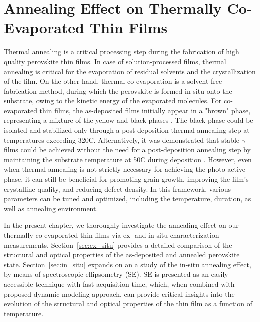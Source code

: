 \chapter{Annealing Effect on Thermally Co-Evaporated  Thin Films}\label{ch:ellipsometry}

Thermal annealing is a critical processing step during the fabrication of high quality perovskite thin films. In case of solution-processed films, thermal annealing is critical for the evaporation of residual solvents and the crystallization of the film. On the other hand, thermal co-evaporation is a solvent-free fabrication method, during which the perovskite is formed in-situ onto the substrate, owing to the kinetic energy of the evaporated molecules. For co-evaporated  thin films, the as-deposited films initially appear in a "brown" phase, representing a mixture of the yellow and black phases \cite{Frolova2017HighlyPbIsub2/sub, PintorMonroy2021All-EvaporatedApplications}. The black phase could be isolated and stabilized only through a post-deposition thermal annealing step at temperatures exceeding 320\degree C. Alternatively, it was demonstrated that stable $\gamma-$ films could be achieved without the need for a post-deposition annealing step by maintaining the substrate temperature at 50\degree C during deposition \cite{Dong2021High-TemperatureCells}. However, even when thermal annealing is not strictly necessary for achieving the photo-active phase, it can still be beneficial for promoting grain growth, improving the film's crystalline quality, and reducing defect density. In this framework, various parameters can be tuned and optimized, including the temperature, duration, as well as annealing environment.

In the present chapter, we thoroughly investigate the annealing effect on our thermally co-evaporated  thin films via ex- and in-situ characterization measurements. Section~\ref{sec:ex_situ} provides a detailed comparison of the structural and optical properties of the as-deposited and annealed perovskite state. Section~\ref{sec:in_situ} expands on an a study of the in-situ annealing effect, by means of spectroscopic ellipsometry (SE). SE is presented as an easily accessible technique with fast acquisition time, which, when combined with proposed dynamic modeling approach, can provide critical insights into the evolution of the structural and optical properties of the thin film as a function of temperature. 


